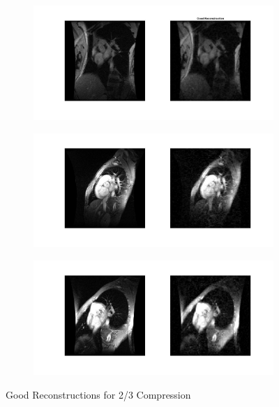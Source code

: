 \documentclass[a4paper]{article}
\begin{document}
\begin{figure}[h]
\begin{subfigure}{.5\textwidth}
  \centering
  \includegraphics[width = 6in]{good11.jpg}
  \label{fig:sfig1}
\end{subfigure}%

\begin{subfigure}{.5\textwidth}
  \centering
  \includegraphics[width = 6in]{good12.jpg}
  \label{fig:sfig2}
\end{subfigure}

\begin{subfigure}{.5\textwidth}
  \centering
  \includegraphics[width = 6in]{good13.jpg}
  \label{fig:sfig2}
\end{subfigure}
\caption{Good Reconstructions for 2/3 Compression}
\end{figure}
\end{document}

